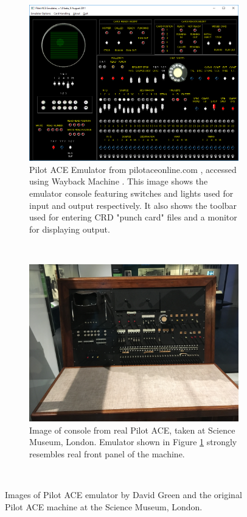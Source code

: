 \documentclass{l4proj}
\begin{document}
\begin{figure}[h]
	\centering
	\begin{subfigure}[t]{0.45\textwidth}
		\includegraphics[width=\textwidth]{images/ace-emulator}
		\caption{Pilot ACE Emulator from pilotaceonline.com \citep{Ace12}, accessed using Wayback Machine \citep{Wayback19}. This image shows the emulator console featuring switches and lights used for input and output respectively. It also shows the toolbar used for entering CRD "punch card" files and a monitor for displaying output.}
		\label{fig:ace-emu}
	\end{subfigure}
	\quad
	~ %
	\begin{subfigure}[t]{0.45\textwidth}
		\includegraphics[width=\textwidth]{images/real-ace}
		\caption{Image of console from real Pilot ACE, taken at Science Museum, London. Emulator shown in Figure \ref{fig:ace-emu} strongly resembles real front panel of the machine.}
		\label{fig:real-ace}
	\end{subfigure}
	~ %
	\caption{Images of Pilot ACE emulator by David Green and the original Pilot ACE machine at the Science Museum, London.}
	\label{fig:ace-comps}
\end{figure}
\end{document}
